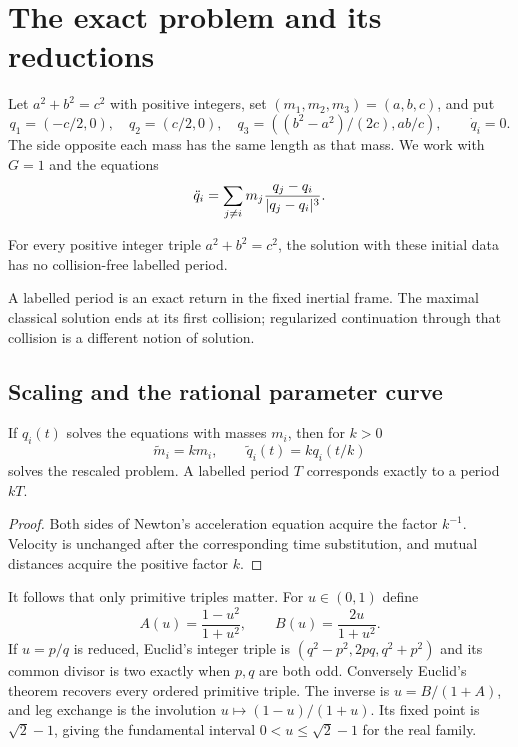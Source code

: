 \section{The exact problem and its reductions}\label{sec:exact}

Let $a^2+b^2=c^2$ with positive integers, set
$(m_1,m_2,m_3)=(a,b,c)$, and put
\[
q_1=(-c/2,0),\quad q_2=(c/2,0),\quad
q_3=((b^2-a^2)/(2c),ab/c),\qquad \dot q_i=0.
\]
The side opposite each mass has the same length as that mass.  We work with $G=1$ and the equations
\[
 \ddot q_i=\sum_{j\ne i}m_j{q_j-q_i\over|q_j-q_i|^3}.
\]
\begin{conjecture}
For every positive integer triple $a^2+b^2=c^2$, the solution with these
initial data has no collision-free labelled period.
\end{conjecture}
A labelled period is an exact return in the fixed inertial frame. The
maximal classical solution ends at its first collision; regularized
continuation through that collision is a different notion of solution.

\subsection{Scaling and the rational parameter curve}

\begin{lemma}
If $q_i(t)$ solves the equations with masses $m_i$, then for $k>0$
\[
\widetilde m_i=km_i,\qquad \widetilde q_i(t)=kq_i(t/k)
\]
solves the rescaled problem.  A labelled period $T$ corresponds exactly to a
period $kT$.
\end{lemma}
\begin{proof}
Both sides of Newton's acceleration equation acquire the factor $k^{-1}$.
Velocity is unchanged after the corresponding time substitution, and mutual
distances acquire the positive factor $k$.
\end{proof}

It follows that only primitive triples matter.  For $u\in(0,1)$ define
\[
A(u)=\frac{1-u^2}{1+u^2},\qquad
B(u)=\frac{2u}{1+u^2}.
\]
If $u=p/q$ is reduced, Euclid's integer triple is
$(q^2-p^2,2pq,q^2+p^2)$ and its common divisor is two exactly when $p,q$ are
both odd.  Conversely Euclid's theorem recovers every ordered primitive
triple.  The inverse is $u=B/(1+A)$, and leg exchange is the involution
$u\mapsto(1-u)/(1+u)$.  Its fixed point is $\sqrt2-1$, giving the fundamental
interval $0<u\leq\sqrt2-1$ for the real family.

